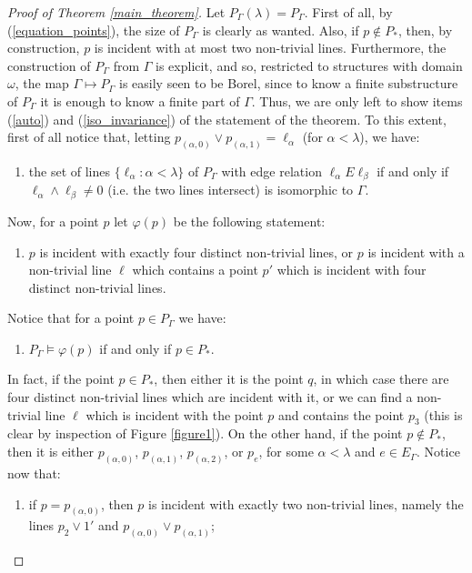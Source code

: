 \documentclass{amsart}
\numberwithin{claimcounter}{theorem}
\begin{document}
\begin{proof}[Proof of Theorem \ref{main_theorem}]
\smallskip
\noindent Let $P_{\Gamma}(\lambda) = P_{\Gamma}$. First of all, by (\ref{equation_points}), the size of $P_{\Gamma}$ is clearly as wanted. Also, if $p \notin P_*$, then, by construction, $p$ is incident with at most two non-trivial lines. Furthermore, the construction of $P_{\Gamma}$ from $\Gamma$ is explicit, and so, restricted to structures with domain $\omega$, the map $\Gamma \mapsto P_{\Gamma}$ is easily seen to be Borel, since to know a finite substructure of $P_\Gamma$ it is enough to know a finite part of $\Gamma$.  Thus, we are only left to show items (\ref{auto}) and (\ref{iso_invariance}) of the statement of the theorem. To this extent, first of all notice that, letting $p_{(\alpha, 0)} \vee p_{(\alpha, 1)} = \ell_{\alpha}$ (for $\alpha < \lambda$), we have: 
\begin{enumerate}[$(\star_1)$]
\item the set of lines $\{ \ell_{\alpha} : \alpha < \lambda \}$ of $P_{\Gamma}$ with edge relation $\ell_\alpha E \ell_\beta$ if and only if $\ell_\alpha \wedge \ell_\beta \neq 0$ (i.e. the two lines intersect) is isomorphic to $\Gamma$.
\end{enumerate}
Now, for a point $p$ let $\varphi(p)$ be the following statement: 
\begin{enumerate}[$(S)$]
\item $p$ is incident with exactly four distinct non-trivial lines, or $p$ is incident with a non-trivial line $\ell$ which contains a point $p'$ which is incident with four distinct non-trivial lines.%
\end{enumerate} 
Notice that for a point $p \in P_{\Gamma}$ we have:
\begin{enumerate}[$(\star_2)$]
\item $P_{\Gamma} \models \varphi(p)$ if and only if $p \in P_*$.
\end{enumerate}
In fact, if the point $p \in P_*$, then either it is the point $q$, in which case there are four distinct non-trivial lines which are incident with it, or we can find a non-trivial line $\ell$ which is incident with the point $p$ and contains the point $p_3$ (this is clear by inspection of Figure \ref{figure1}). On the other hand, if the point $p \not\in P_*$, then it is either $p_{(\alpha, 0)}$, $p_{(\alpha, 1)}$, $p_{(\alpha, 2)}$, or $p_e$, for some $\alpha < \lambda$ and $e \in E_{\Gamma}$. Notice now that: 
\begin{enumerate}[$(\star_3)$]
	\item if $p = p_{(\alpha, 0)}$, then $p$ is incident with exactly two non-trivial lines, namely the lines $p_2 \vee 1'$ and $p_{(\alpha, 0)} \vee p_{(\alpha, 1)}$;

\end{enumerate}
\end{proof}
\end{document}
